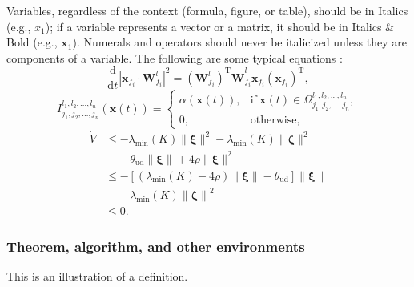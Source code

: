 \documentclass[twoside,twocolumn]{article}
\begin{document}
Variables, regardless of the context (formula, figure, or table), should be in Italics (e.g., $x_1$); if a variable represents a vector or a matrix, it should be in Italics \& Bold (e.g., $\bm{x}_1$). Numerals and operators should never be italicized unless they are components of a variable. The following are some typical equations \citep{Theodoridis11}:
\begin{equation}
\frac{\mathrm{d}}{\mathrm{d}t} {| \bar{\bm{x}}_{f_i} \cdot {\bm{W}}_{f_i}^l |^2 }= ({{\bm{W}}_{f_i}^l})^\mathrm{T} \dot {\bm{W}}_{f_i}^l \bar {\bm{x}}_{f_i} ({\bar {\bm{x}}_{f_i}})^\mathrm{T},
\end{equation}
\begin{equation}\label{indicatorfunc}
I_{j_1, j_2, \ldots, j_n}^{l_1, l_2, \ldots, l_n} (\bm{x}(t))= 
	\begin{cases}
		\alpha(\bm{x}(t)), & \mathrm{if}\ \bm{x}(t) \in \Omega_{j_1, j_2, \ldots, j_n}^{l_1, l_2, \ldots, l_n}, \\
		0,                 & \mathrm{otherwise},
	\end{cases}
\end{equation}
\begin{equation}\label{eqn:Lyapdisturb1}
\begin{aligned}
	\dot{V} & \leq  - \lambda_{\min} ( K ) \| \bm{\xi} \|^2 - \lambda_{\min} ( K ) \| \bm{\zeta} \|^2                       \\
	        & \quad + \theta_\mathrm{ud} \| \bm{\xi} \| + 4 \rho \| \bm{\xi} \|^2                                           \\
	        & \leq  - \left[ ( \lambda_{\min} ( K )- 4 \rho ) \| \bm{\xi} \|  -  \theta_\mathrm{ud}  \right] \| \bm{\xi} \| \\
	        & \quad -\lambda_{\min} ( K ) \left\| \bm{\zeta} \right\|^2                                                     \\
	        & \leq 0.
\end{aligned}
\end{equation}


\subsubsection{Theorem, algorithm, and other environments}

\begin{definition}
This is an illustration of a definition.
\end{definition}
\end{document}
